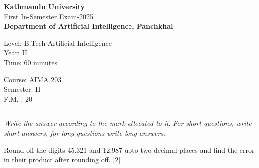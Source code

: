 \documentclass[12pt]{exam}
\begin{document}
\begin{center}
 {\bfseries  {\Large Kathmandu University}} \\[1mm]
 First In-Semester Exam-2025\\[-1mm]
 {\small \textbf{Department of Artificial Intelligence, Panchkhal}}
\end{center}
\vskip 5mm

\begin{minipage}{0.70\linewidth}
  \begin{flushleft}
    Level: B.Tech Artificial Intelligence \\
    Year: II \\
    Time: 60 minutes
  \end{flushleft}
\end{minipage} \hfill
\begin{minipage}{0.25\linewidth}
  \begin{flushleft}
    Course: AIMA 203 \\
    Semester: II \\
    F.M. : 20
  \end{flushleft}
\end{minipage}
\vskip 2mm
\rule{\textwidth}{1pt}
\hskip 15mm \textit{Write the answer according to the mark allocated to it}. \textit{For short questions, write short answers, for long questions write long answers}.

\vskip 10mm

\begin{questions}

\question Round off the digits 45.321 and 12.987 upto two decimal places and find the error in their product after rounding off. [2]

\question


\end{questions}
\end{document}
